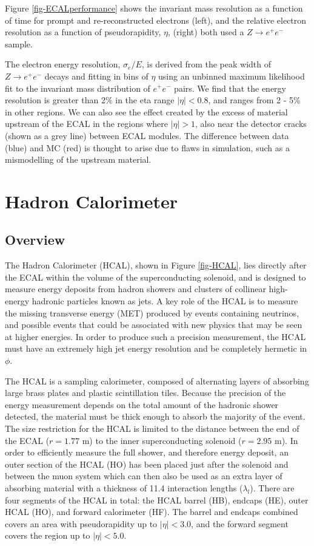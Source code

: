 Figure \ref{fig-ECALperformance} shows the invariant mass resolution as a function of time for prompt and re-reconstructed electrons (left), and the relative electron resolution as a function of pseudorapidity, $\eta$, (right) both used a $Z \to e^+e^-$ sample. 

The electron energy resolution, $\sigma_e/E$, is derived from the peak width of $Z \to e^+e^-$ decays and fitting in bins of $\eta$ using an unbinned maximum likelihood fit to the invariant mass distribution of $e^+e^-$ pairs. We find that the energy resolution is greater than 2\% in the eta range $|\eta| < 0.8$, and ranges from 2 - 5\% in other regions. We can also see the effect created by the excess of material upstream of the ECAL in the regions where $|\eta| > 1$, also near the detector cracks (shown as a grey line) between ECAL modules. The difference between data (blue) and MC (red) is thought to arise due to flaws in simulation, such as a mismodelling of the upstream material.


\section{Hadron Calorimeter} \label{sec-HadronCalorimeter}

\subsection{Overview}

The Hadron Calorimeter (HCAL), shown in Figure \ref{fig-HCAL}, lies directly after the ECAL within the volume of the superconducting solenoid, and is designed to measure energy deposits from hadron showers and clusters of collinear high-energy hadronic particles known as jets. A key role of the HCAL is to measure the missing transverse energy (MET) produced by events containing neutrinos, and possible events that could be associated with new physics that may be seen at higher energies. In order to produce such a precision measurement, the HCAL must have an extremely high jet energy resolution and be completely hermetic in $\phi$. 

The HCAL is a sampling calorimeter, composed of alternating layers of absorbing large brass plates and plastic scintillation tiles. Because the precision of the energy measurement depends on the total amount of the hadronic shower detected, the material must be thick enough to absorb the majority of the event. The size restriction for the HCAL is limited to the distance between the end of the ECAL ($r=1.77$ m) to the inner superconducting solenoid ($r=2.95$ m). In order to efficiently measure the full shower, and therefore energy deposit, an outer section of the HCAL (HO) has been placed just after the solenoid and between the muon system which can then also be used as an extra layer of absorbing material with a thickness of 11.4 interaction lengths ($\lambda_l$). There are four segments of the HCAL in total: the HCAL barrel (HB), endcaps (HE), outer HCAL (HO), and forward calorimeter (HF). The barrel and endcaps combined covers an area with pseudorapidity up to $|\eta|<3.0$, and the forward segment covers the region up to $|\eta|<5.0$.  

